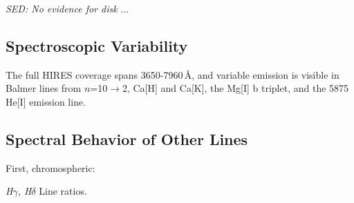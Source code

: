 \documentclass{nature3}
\begin{document}
\begin{methods}


{\it SED: No evidence for disk}
...



\subsection{Spectroscopic Variability}\phantom{+}

The full HIRES coverage spans 3650-7960\,\AA, and variable
  emission is visible in Balmer lines from $n$=10$\rightarrow$2, Ca[H]
  and Ca[K], the Mg[I] b triplet, and the 5875 He[I] emission line.




\subsection{Spectral Behavior of Other Lines}

First, chromospheric:

{\it H$\gamma$, H$\delta$}
Line ratios.


\end{methods}
\end{document}
